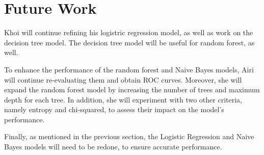 \section{Future Work}

Khoi will continue refining his logistric regression model, as well as work on the decision tree model. The decision tree model will be useful for random forest, as well.

To enhance the performance of the random forest and Naive Bayes models, Airi will continue re-evaluating them and obtain ROC curves. Moreover, she will expand the random forest model by increasing the number of trees and maximum depth for each tree. In addition, she will experiment with two other criteria, namely entropy and chi-squared, to assess their impact on the model's performance.

Finally, as mentioned in the previous section, the Logistic Regression and Naive Bayes models will need to be redone, to ensure accurate performance.